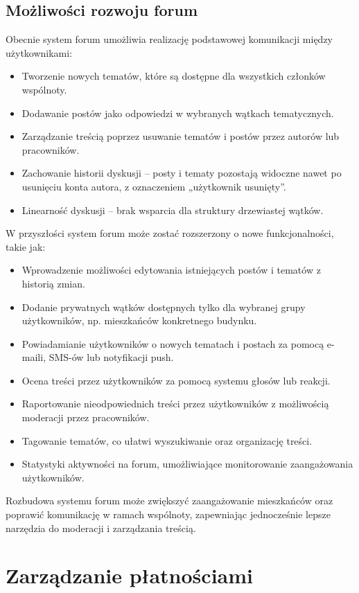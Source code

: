 \subsection{Możliwości rozwoju forum}
Obecnie system forum umożliwia realizację podstawowej komunikacji między użytkownikami:
\begin{itemize}
    \item Tworzenie nowych tematów, które są dostępne dla wszystkich członków wspólnoty.
    \item Dodawanie postów jako odpowiedzi w wybranych wątkach tematycznych.
    \item Zarządzanie treścią poprzez usuwanie tematów i postów przez autorów lub pracowników.
    \item Zachowanie historii dyskusji – posty i tematy pozostają widoczne nawet po usunięciu konta autora, z oznaczeniem „użytkownik usunięty”.
    \item Linearność dyskusji – brak wsparcia dla struktury drzewiastej wątków.
\end{itemize}
W przyszłości system forum może zostać rozszerzony o nowe funkcjonalności, takie jak:
\begin{itemize}
    \item Wprowadzenie możliwości edytowania istniejących postów i tematów z historią zmian.
    \item Dodanie prywatnych wątków dostępnych tylko dla wybranej grupy użytkowników, np. mieszkańców konkretnego budynku.
    \item Powiadamianie użytkowników o nowych tematach i postach za pomocą e-maili, SMS-ów lub notyfikacji push.
    \item Ocena treści przez użytkowników za pomocą systemu głosów lub reakcji.
    \item Raportowanie nieodpowiednich treści przez użytkowników z możliwością moderacji przez pracowników.
    \item Tagowanie tematów, co ułatwi wyszukiwanie oraz organizację treści.
    \item Statystyki aktywności na forum, umożliwiające monitorowanie zaangażowania użytkowników.
\end{itemize}

Rozbudowa systemu forum może zwiększyć zaangażowanie mieszkańców oraz poprawić komunikację w ramach wspólnoty, zapewniając jednocześnie lepsze narzędzia do moderacji i zarządzania treścią.

\section{Zarządzanie płatnościami}

